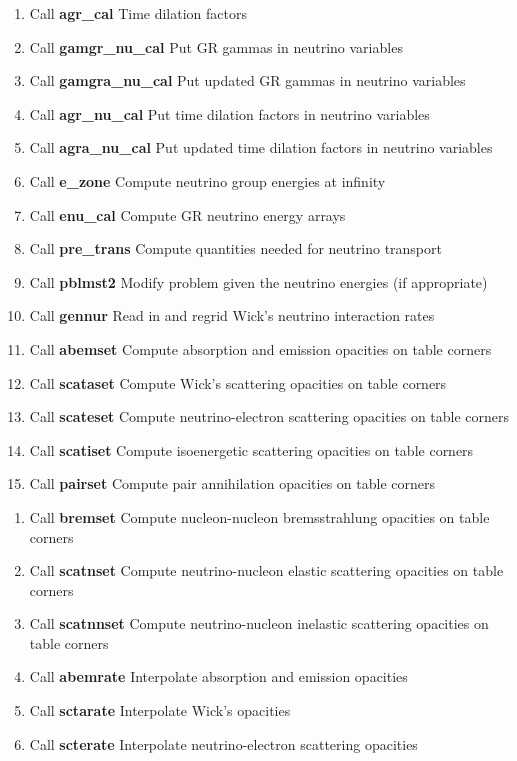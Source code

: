 \documentclass[11pt,doublespace]{article}
\begin{document}
\begin{itemize}
\begin{enumerate}
\begin{enumerate}
\begin{enumerate}
\begin{enumerate}
  \item Call {\bf agr\_cal} Time dilation factors
  \item Call {\bf gamgr\_nu\_cal} Put GR gammas in neutrino variables
  \item Call {\bf gamgra\_nu\_cal} Put updated GR gammas in neutrino variables
  \item Call {\bf agr\_nu\_cal} Put time dilation factors in neutrino variables
  \item Call {\bf agra\_nu\_cal} Put updated time dilation factors in neutrino variables
  \item Call {\bf e\_zone} Compute neutrino group energies at infinity
  \item Call {\bf enu\_cal} Compute GR neutrino energy arrays
  \item Call {\bf pre\_trans} Compute quantities needed for neutrino transport
  \item Call {\bf pblmst2} Modify problem given the neutrino energies (if appropriate)
  \item Call {\bf gennur} Read in and regrid Wick's neutrino interaction rates
  \item Call {\bf abemset} Compute absorption and emission opacities on table corners
  \item Call {\bf scataset} Compute Wick's scattering opacities on table corners
  \item Call {\bf scateset} Compute neutrino-electron scattering opacities on table corners
  \item Call {\bf scatiset} Compute isoenergetic scattering opacities on table corners
  \item Call {\bf pairset} Compute pair annihilation opacities on table corners
\end{enumerate}
\begin{enumerate}
  \item Call {\bf bremset} Compute nucleon-nucleon bremsstrahlung opacities on table corners
  \item Call {\bf scatnset} Compute neutrino-nucleon elastic scattering opacities on table corners
  \item Call {\bf scatnnset} Compute neutrino-nucleon inelastic scattering opacities on table corners
  \item Call {\bf abemrate} Interpolate absorption and emission opacities
  \item Call {\bf sctarate} Interpolate Wick's opacities
  \item Call {\bf scterate} Interpolate neutrino-electron scattering opacities

\end{enumerate}
\end{enumerate}
\end{enumerate}
\end{enumerate}
\end{itemize}
\end{document}
